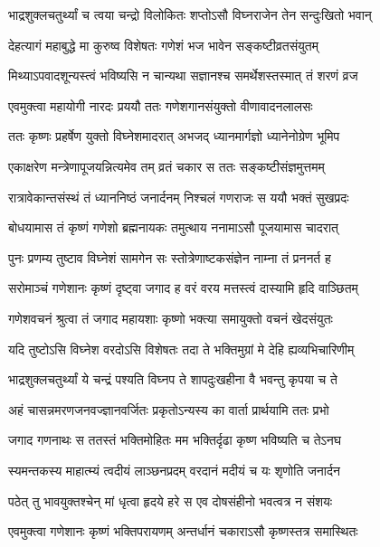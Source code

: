 \twolineshloka
{भाद्रशुक्लचतुर्थ्यां च त्वया चन्द्रो विलोकितः}
{शप्तोऽसौ विघ्नराजेन तेन सन्दुःखितो भवान्} %

\twolineshloka
{देहत्यागं महाबुद्धे मा कुरुष्व विशेषतः}
{गणेशं भज भावेन सङ्कष्टीव्रतसंयुतम्} %

\twolineshloka
{मिथ्याऽपवादशून्यस्त्वं भविष्यसि न चान्यथा}
{सज्ञानश्च समर्थेशस्तस्मात् तं शरणं व्रज} %

\twolineshloka
{एवमुक्त्वा महायोगी नारदः प्रययौ ततः}
{गणेशगानसंयुक्तो वीणावादनलालसः} %

\twolineshloka
{ततः कृष्णः प्रहर्षेण युक्तो विघ्नेशमादरात्}
{अभजद् ध्यानमार्गज्ञो ध्यानेनोग्रेण भूमिप} %

\twolineshloka
{एकाक्षरेण मन्त्रेणापूजयन्नित्यमेव तम्}
{व्रतं चकार स ततः सङ्कष्टीसंज्ञमुत्तमम्} %

\twolineshloka
{रात्रावेकान्तसंस्थं तं ध्याननिष्ठं जनार्दनम्}
{निश्चलं गणराजः स ययौ भक्तं सुखप्रदः} %

\twolineshloka
{बोधयामास तं कृष्णं गणेशो ब्रह्मनायकः}
{तमुत्थाय ननामाऽसौ पूजयामास चादरात्} %

\twolineshloka
{पुनः प्रणम्य तुष्टाव विघ्नेशं सामगेन सः}
{स्तोत्रेणाष्टकसंज्ञेन नाम्ना तं प्रननर्त ह} %

\twolineshloka
{सरोमाञ्चं गणेशानः कृष्णं दृष्ट्वा जगाद ह}
{वरं वरय मत्तस्त्वं दास्यामि हृदि वाञ्छितम्} %

\twolineshloka
{गणेशवचनं श्रुत्वा तं जगाद महायशाः}
{कृष्णो भक्त्या समायुक्तो वचनं खेदसंयुतः} %


\twolineshloka
{यदि तुष्टोऽसि विघ्नेश वरदोऽसि विशेषतः}
{तदा ते भक्तिमुग्रां मे देहि ह्यव्यभिचारिणीम्} %

\twolineshloka
{भाद्रशुक्लचतुर्थ्यां ये चन्द्रं पश्यति विघ्नप}
{ते शापदुःखहीना वै भवन्तु कृपया च ते} %

\twolineshloka
{अहं चासन्नमरणजनवज्ज्ञानवर्जितः}
{प्रकृतोऽन्यस्य का वार्ता प्रार्थयामि ततः प्रभो} %

\twolineshloka
{जगाद गणनाथः स ततस्तं भक्तिमोहितः}
{मम भक्तिर्दृढा कृष्ण भविष्यति च तेऽनघ} %

\twolineshloka
{स्यमन्तकस्य माहात्म्यं त्वदीयं लाञ्छनप्रदम्}
{वरदानं मदीयं च यः श‍ृणोति जनार्दन} %

\twolineshloka
{पठेत् तु भावयुक्तश्चेन् मां धृत्वा हृदये हरे}
{स एव दोषसंहीनो भवत्वत्र न संशयः} %

\twolineshloka
{एवमुक्त्वा गणेशानः कृष्णं भक्तिपरायणम्}
{अन्तर्धानं चकाराऽसौ कृष्णस्तत्र समास्थितः} %

